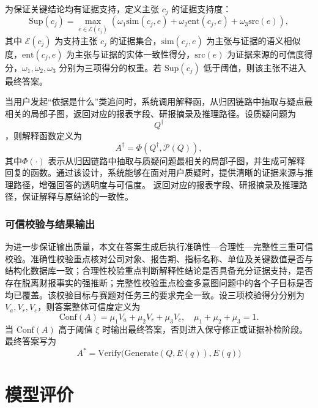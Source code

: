 \documentclass[withoutpreface,bwprint]{cumcmthesis} %
\begin{document}
为保证关键结论均有证据支持，定义主张 $c_j$ 的证据支持度：
\begin{equation}
	\mathrm{Sup}(c_j) = \max_{e\in \mathcal{E}(c_j)} \left( \omega_1 \mathrm{sim}(c_j,e) + \omega_2 \mathrm{ent}(c_j,e) + \omega_3 \mathrm{src}(e) \right),
	\tag{5-21}
\end{equation}
其中 $\mathcal{E}(c_j)$ 为支持主张 $c_j$ 的证据集合，$\mathrm{sim}(c_j,e)$ 为主张与证据的语义相似度，$\mathrm{ent}(c_j,e)$ 为主张与证据的实体一致性得分，$\mathrm{src}(e)$ 为证据来源的可信度得分，$\omega_1,\omega_2,\omega_3$ 分别为三项得分的权重。若 $\mathrm{Sup}(c_j)$ 低于阈值，则该主张不进入最终答案。

当用户发起“依据是什么”类追问时，系统调用解释函，从归因链路中抽取与疑点最相关的局部子图，返回对应的报表字段、研报摘录及推理路径。设质疑问题为$$Q^\dagger$$，则解释函数定义为
\begin{equation}
	A^\dagger=\Phi(Q^\dagger,\mathcal{P}(Q)),
	\tag{5-22}
\end{equation}
其中$\Phi(\cdot)$ 表示从归因链路中抽取与质疑问题最相关的局部子图，并生成可解释回复的函数。通过该设计，系统能够在面对用户质疑时，提供清晰的证据来源与推理路径，增强回答的透明度与可信度。
返回对应的报表字段、研报摘录及推理路径，保证解释与原结论的一致性。

\subsubsection{可信校验与结果输出}
为进一步保证输出质量，本文在答案生成后执行准确性—合理性—完整性三重可信校验。准确性校验重点核对公司对象、报告期、指标名称、单位及关键数值是否与结构化数据库一致；合理性校验重点判断解释性结论是否具备充分证据支持，是否存在脱离财报事实的强推断；完整性校验重点检查多意图问题中的各个子目标是否均已覆盖。该校验目标与赛题对任务三的要求完全一致。设三项校验得分分别为 $V_a,V_r,V_c$，则答案整体可信度定义为
\begin{equation}
	\mathrm{Conf}(A)=\mu_1 V_a+\mu_2 V_r+\mu_3 V_c, \quad \mu_1+\mu_2+\mu_3=1.
	\tag{5-23}
\end{equation}
当 $\mathrm{Conf}(A)$ 高于阈值 $\xi$ 时输出最终答案，否则进入保守修正或证据补检阶段。最终答案写为
\begin{equation}
	A^\ast=\mathrm{Verify}\bigl(\mathrm{Generate}(Q,E(q)),E(q)\bigr)
	\tag{5-24}
\end{equation}
\section{模型评价}
\end{document}
